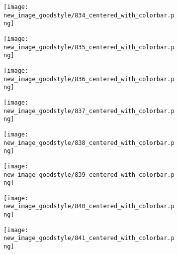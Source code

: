 \documentclass[a4paper,12pt]{article}
\begin{document}
\begin{figure}[H]
  \begin{subfigure}{0.11\textwidth}
    \texttt{[image: new\_image\_goodstyle/834\_centered\_with\_colorbar.png]}
  \end{subfigure}
  \hfill
  \begin{subfigure}{0.11\textwidth}
    \texttt{[image: new\_image\_goodstyle/835\_centered\_with\_colorbar.png]}
  \end{subfigure}
  \hfill
  \begin{subfigure}{0.11\textwidth}
    \texttt{[image: new\_image\_goodstyle/836\_centered\_with\_colorbar.png]}
  \end{subfigure}
  \hfill
  \begin{subfigure}{0.11\textwidth}
    \texttt{[image: new\_image\_goodstyle/837\_centered\_with\_colorbar.png]}
  \end{subfigure}
  \hfill
  \begin{subfigure}{0.11\textwidth}
    \texttt{[image: new\_image\_goodstyle/838\_centered\_with\_colorbar.png]}
  \end{subfigure}
  \hfill
  \begin{subfigure}{0.11\textwidth}
    \texttt{[image: new\_image\_goodstyle/839\_centered\_with\_colorbar.png]}
  \end{subfigure}
  \hfill
  \begin{subfigure}{0.11\textwidth}
    \texttt{[image: new\_image\_goodstyle/840\_centered\_with\_colorbar.png]}
  \end{subfigure}
  \hfill
  \begin{subfigure}{0.11\textwidth}
    \texttt{[image: new\_image\_goodstyle/841\_centered\_with\_colorbar.png]}
  \end{subfigure}
  \hfill
\end{figure}
\end{document}
